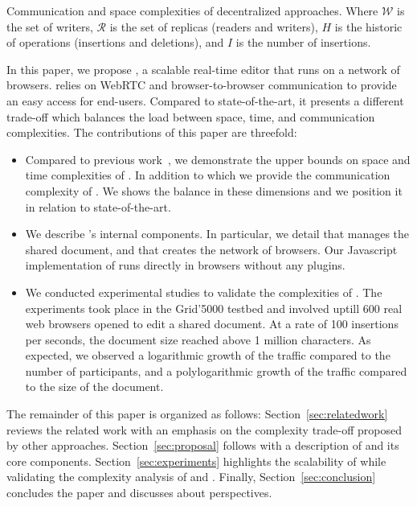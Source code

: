 \begin{table*}[t]
  \centering
  
  \caption{\label{table:complexities}
    Communication and space complexities of decentralized approaches.
    Where $\mathcal{W}$ is the set of writers, 
    $\mathcal{R}$ is the set of replicas (readers and writers),
    $H$ is the historic of operations (insertions and deletions),
    and $I$ is the number of insertions.}
\end{table*}


In this paper, we propose \CRATE, a scalable real-time editor that runs on a
network of browsers. \CRATE relies on WebRTC and browser-to-browser
communication to provide an easy access for end-users. Compared to
state-of-the-art, it presents a different trade-off which balances the load
between space, time, and communication complexities. The contributions of this
paper are threefold:
\begin{itemize}
\item Compared to previous work~\cite{nedelec2013lseq}, we demonstrate the upper
  bounds on space and time complexities of \LSEQ. In addition to which we
  provide the communication complexity of \CRATE. We shows the balance in these
  dimensions and we position it in relation to state-of-the-art.
\item We describe \CRATE's internal components. In particular, we detail \LSEQ
  that manages the shared document, and \SPRAY that creates the network of
  browsers. Our Javascript implementation of \CRATE runs directly in browsers
  without any plugins.
\item We conducted experimental studies to validate the complexities of
  \CRATE. The experiments took place in the Grid'5000 testbed and involved
  uptill $600$ real web browsers opened to edit a shared document. At a rate of
  100 insertions per seconds, the document size reached above 1 million
  characters. As expected, we observed a logarithmic growth of the traffic
  compared to the number of participants, and a polylogarithmic growth of the
  traffic compared to the size of the document.
\end{itemize}

The remainder of this paper is organized as follows:
Section~\ref{sec:relatedwork} reviews the related work with an emphasis on the
complexity trade-off proposed by other approaches. Section~\ref{sec:proposal}
follows with a description of \CRATE and its core
components. Section~\ref{sec:experiments} highlights the scalability of \CRATE
while validating the complexity analysis of \LSEQ and \SPRAY. Finally,
Section~\ref{sec:conclusion} concludes the paper and discusses about
perspectives.

